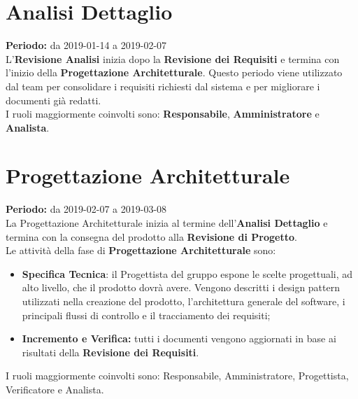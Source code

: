 \section{Analisi Dettaglio}
\textbf{Periodo:} da 2019-01-14 a 2019-02-07\\
L'\textbf{Revisione Analisi} inizia dopo la \textbf{Revisione dei Requisiti} e termina con l’inizio della \textbf{Progettazione Architetturale}. Questo periodo viene utilizzato dal team per consolidare i requisiti richiesti dal sistema e per migliorare i documenti già redatti.\\I ruoli maggiormente coinvolti sono: \textbf{Responsabile}, \textbf{Amministratore} e \textbf{Analista}.

\section{Progettazione Architetturale}
\textbf{Periodo:} da 2019-02-07 a 2019-03-08\\
La Progettazione Architetturale inizia al termine dell’\textbf{Analisi Dettaglio} e termina con la consegna del prodotto alla \textbf{Revisione di Progetto}.\\
Le attività della fase di \textbf{Progettazione Architetturale} sono:
\begin{itemize}
    \item \textbf{Specifica Tecnica}: il Progettista del gruppo espone le scelte progettuali, ad alto livello, che il prodotto dovrà avere. Vengono descritti i design pattern utilizzati nella creazione del prodotto, l’architettura generale del software, i principali flussi di controllo e il tracciamento dei requisiti;
    \item \textbf{Incremento e Verifica:} tutti i documenti vengono aggiornati in base ai risultati della \textbf{Revisione dei Requisiti}.
\end{itemize}
I ruoli maggiormente coinvolti sono: Responsabile, Amministratore, Progettista, Verificatore e Analista.

